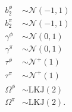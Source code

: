 \documentclass{beamer}
\begin{document}
\begin{frame}
\begin{center}
\begin{scriptsize}
\begin{columns}
\begin{column}{0.5\textwidth}
\begin{align*}
            b^{\phi}_{2} &\sim \mathcal{N}(-1, 1) \\
            b^{\pi}_{2} &\sim \mathcal{N}(-1, 1) \\
            \gamma^{\phi} &\sim \mathcal{N}(0, 1) \\
            \gamma^{\pi} &\sim \mathcal{N}(0, 1) \\
            \tau^{\phi} &\sim \mathcal{N}^{+}(1) \\
            \tau^{\pi} &\sim \mathcal{N}^{+}(1) \\
            \Omega^{\phi} &\sim \text{LKJ}(2) \\
            \Omega^{\pi} &\sim \text{LKJ}(2). \\
          \end{align*}
        \end{column}
      \end{columns}
    \end{scriptsize} 
  \end{center}
\end{frame}

%
\end{document}
